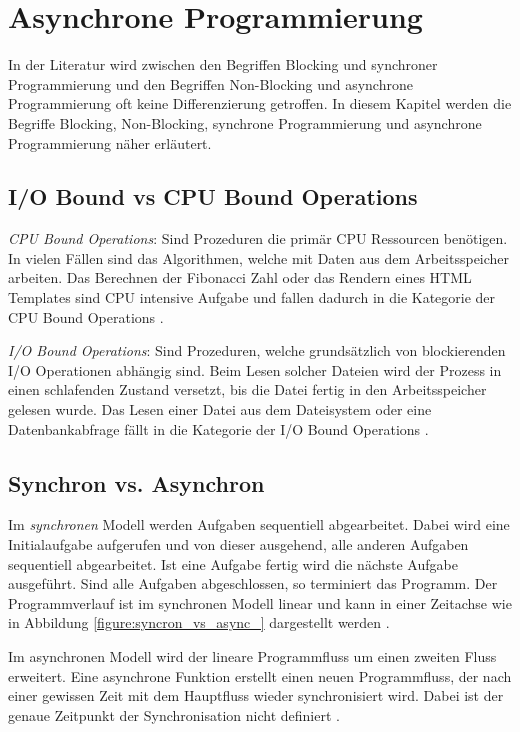 \section{Asynchrone Programmierung}

In der Literatur wird zwischen den Begriffen Blocking und synchroner Programmierung und den Begriffen Non-Blocking und asynchrone Programmierung oft keine Differenzierung getroffen. In diesem Kapitel werden die Begriffe Blocking, Non-Blocking, synchrone Programmierung und asynchrone Programmierung näher erläutert. 

\subsection{I/O Bound vs CPU Bound Operations}

\emph{CPU Bound Operations}: Sind Prozeduren die primär CPU Ressourcen benötigen. In vielen Fällen sind das Algorithmen, welche mit Daten aus dem Arbeitsspeicher arbeiten. Das Berechnen der Fibonacci Zahl oder das Rendern eines HTML Templates sind CPU intensive Aufgabe und fallen dadurch in die Kategorie der CPU Bound Operations \cite[p. 70]{Erb2012}. 

\emph{I/O Bound Operations}: Sind Prozeduren, welche grundsätzlich von blockierenden I/O Operationen abhängig sind. Beim Lesen solcher Dateien wird der Prozess in einen schlafenden Zustand versetzt, bis die Datei fertig in den Arbeitsspeicher gelesen wurde. Das Lesen einer Datei aus dem Dateisystem oder eine Datenbankabfrage fällt in die Kategorie der I/O Bound Operations \cite[p. 70]{Erb2012}. 

\subsection{Synchron vs. Asynchron}

Im \emph{synchronen} Modell werden Aufgaben sequentiell abgearbeitet. Dabei wird eine Initialaufgabe aufgerufen und von dieser ausgehend, alle anderen Aufgaben sequentiell abgearbeitet. Ist eine Aufgabe fertig wird die nächste Aufgabe ausgeführt. Sind alle Aufgaben abgeschlossen, so terminiert das Programm. Der Programmverlauf ist im synchronen Modell linear und kann in einer Zeitachse wie in Abbildung \ref{figure:syncron_vs_async_} dargestellt werden \cite[]{Pet2015}.

Im asynchronen Modell wird der lineare Programmfluss um einen zweiten Fluss erweitert. Eine asynchrone Funktion erstellt einen neuen Programmfluss, der nach einer gewissen Zeit mit dem Hauptfluss wieder synchronisiert wird. Dabei ist der genaue Zeitpunkt der Synchronisation nicht definiert \cite[]{Pet2015}. 

